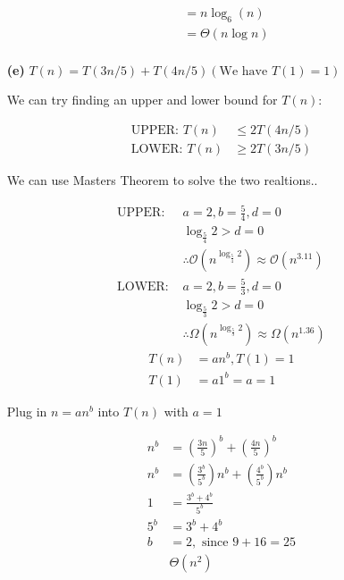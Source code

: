 \documentclass[12pt]{article}
\begin{document}
\begin{enumerate}
\begin{align*}
                &= n \log_6(n) \\
                &= \boxed{\Theta\left(n\log n\right)} \\
            \end{align*}
        \newpage
        \color{black}
        \item[\textbf{(e)}] $T(n) = T(3n/5) + T(4n/5) (\text{We have } T(1) = 1)$ \\
        \color{blue}
            \begin{center}
                We can try finding an upper and lower bound for $T(n)$:
            \end{center}
            \begin{align*}
                \text{UPPER: } T(n) &\le 2T(4n/5) \\
                \text{LOWER: } T(n) &\ge 2T(3n/5)
            \end{align*}
            \begin{center}
                We can use Masters Theorem to solve the two realtions..
            \end{center}
            \begin{align*}
                \text{UPPER: } &a = 2, b = \frac{5}{4}, d = 0 \\
                &\log_{\frac{5}{4}}2 > d = 0\\
                &\therefore \mathcal{O}(n^{\log_{\frac{5}{4}}2}) \approx \mathcal{O}(n^{3.11})\\
                \text{LOWER: } &a = 2, b = \frac{5}{3}, d = 0 \\
                &\log_{\frac{5}{3}}2 > d = 0\\
                &\therefore \Omega(n^{\log_{\frac{5}{3}}2}) \approx \Omega(n^{1.36})
            \end{align*}
            \begin{align*}
                T(n) &= an^b, T(1) = 1 \\
                T(1) &= a1^b = a = 1
            \end{align*}
            \begin{center}
                Plug in $n=an^b$ into $T(n)$ with $a = 1$
            \end{center}
            \begin{align*}
                n^b &= \left(\frac{3n}{5}\right)^b + \left(\frac{4n}{5}\right)^b \\
                n^b &= \left(\frac{3^b}{5^b}\right)n^b + \left(\frac{4^b}{5^b}\right)n^b \\
                1 &= \frac{3^b + 4^b}{5^b} \\
                5^b &= 3^b + 4^b \\
                b &= 2, \text{ since } 9 + 16 = 25 \\
                &\boxed{\Theta(n^2)}
            \end{align*}
    \end{enumerate}
    \newpage
\end{document}
